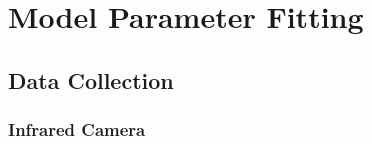\section{Model Parameter Fitting}
\label{sec:ModelParameterFitting}



\subsection{Data Collection}


\subsubsection{Infrared Camera}





